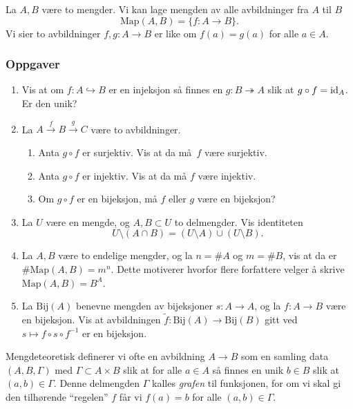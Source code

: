 \begin{example}
    La $A, B$ være to mengder.
    Vi kan lage mengden av alle avbildninger fra $A$ til $B$
    \[
        \mathrm{Map}(A,B) = \{f\colon A\to B\}.
    \]
    Vi sier to avbildninger $f,g\colon A\to B$
    er like om $f(a) = g(a)$ for alle $a\in A$.
\end{example}

\subsubsection*{Oppgaver}

\begin{enumerate}
    \item Vis at om $f\colon A\hookrightarrow B$ er en injeksjon
        så finnes en $g\colon B\twoheadrightarrow A$ slik at
        $g\circ f = \operatorname{id}_A$.
        Er den unik?
    \item La $A\xrightarrow{f} B\xrightarrow{g} C$ være to avbildninger.
        \begin{enumerate}
            \item
                Anta $g\circ f$ er surjektiv.
                Vis at da må $f$ være surjektiv.
            \item
                Anta $g\circ f$ er injektiv.
                Vis at da må $f$ være injektiv.
            \item
                Om $g\circ f$ er en bijeksjon, må $f$ eller $g$ være en bijeksjon?
        \end{enumerate}
    \item La $U$ være en mengde, og $A, B\subset U$ to delmengder.
        Vis identiteten
        \[
            U\setminus(A\cap B) = (U\setminus A)\cup (U\setminus B).
        \]
    \item La $A, B$ være to endelige mengder, og la $n = \# A$ og $m=\# B$,
        vis at da er $\# \mathrm{Map}(A,B) = m^n$.
        Dette motiverer hvorfor flere forfattere velger å skrive
        $\mathrm{Map}(A,B) = B^A$.
    \item La $\mathrm{Bij}(A)$ benevne mengden av bijeksjoner $s\colon A\to A$,
        og la $f\colon A\to B$ være en bijeksjon.
        Vis at avbildningen $\tilde f\colon \mathrm{Bij}(A)\to \mathrm{Bij}(B)$
        gitt ved $s\mapsto f\circ s\circ f^{-1}$ er en bijeksjon.
\end{enumerate}
Mengdeteoretisk definerer vi ofte en avbildning $A\to B$ som en samling data
$(A, B, \Gamma)$ med $\Gamma\subset A\times B$ slik at for alle $a\in A$
så finnes en unik $b\in B$ slik at $(a,b)\in \Gamma$.
Denne delmengden $\Gamma$ kalles \textit{grafen} til funksjonen,
for om vi skal gi den tilhørende ``regelen'' $f$ får vi $f(a) = b$
for alle $(a,b)\in \Gamma$.

